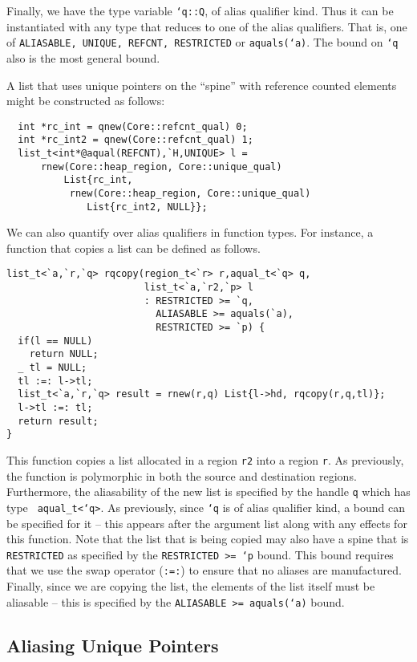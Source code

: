 Finally, we have the type variable {\tt `q::Q}, of alias qualifier
kind. Thus it can be instantiated with any type that reduces to one of
the alias qualifiers. That is, one of {\tt ALIASABLE, UNIQUE, REFCNT,
RESTRICTED} or {\tt aquals(`a)}. The bound on {\tt `q} also is the
most general bound.

A list that uses unique pointers on the ``spine'' with reference
counted elements might be constructed as follows:

\begin{verbatim}
  int *rc_int = qnew(Core::refcnt_qual) 0;
  int *rc_int2 = qnew(Core::refcnt_qual) 1;
  list_t<int*@aqual(REFCNT),`H,UNIQUE> l =
      rnew(Core::heap_region, Core::unique_qual) 
          List{rc_int, 
	       rnew(Core::heap_region, Core::unique_qual) 
	          List{rc_int2, NULL}};
\end{verbatim}

We can also quantify over alias qualifiers in function types. For
instance, a function that copies a list can be defined as follows.

\begin{verbatim}
list_t<`a,`r,`q> rqcopy(region_t<`r> r,aqual_t<`q> q,
                        list_t<`a,`r2,`p> l
                        : RESTRICTED >= `q,
                          ALIASABLE >= aquals(`a),
                          RESTRICTED >= `p) {
  if(l == NULL)
    return NULL;
  _ tl = NULL;
  tl :=: l->tl;
  list_t<`a,`r,`q> result = rnew(r,q) List{l->hd, rqcopy(r,q,tl)};
  l->tl :=: tl;
  return result;
}
\end{verbatim}

This function copies a list allocated in a region {\tt r2} into a
region {\tt r}. As previously, the function is polymorphic in both the
source and destination regions. Furthermore, the aliasability of the
new list is specified by the handle {\tt q} which has type {\tt
aqual\_t<`q>}. As previously, since {\tt `q} is of alias qualifier
kind, a bound can be specified for it -- this appears after the
argument list along with any effects for this function. Note that the
list that is being copied may also have a spine that is {\tt
RESTRICTED} as specified by the {\tt RESTRICTED >= `p} bound. This
bound requires that we use the swap operator ({\tt :=:}) to ensure
that no aliases are manufactured. Finally, since we are copying the
list, the elements of the list itself must be aliasable -- this is
specified by the {\tt ALIASABLE >= aquals(`a)} bound.

\subsection{Aliasing Unique Pointers}
\label{sec:alias}

